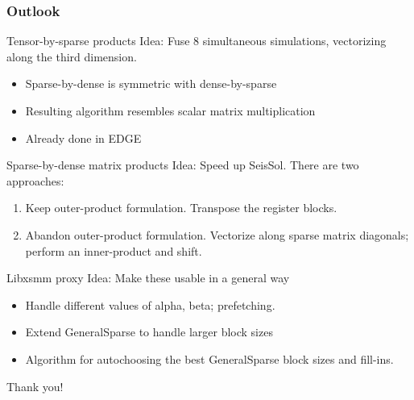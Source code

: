 \documentclass[9pt]{beamer}
\begin{document}
\begin{frame}[fragile]
  \frametitle{Outlook}

  \begin{block}{Tensor-by-sparse products}
  Idea: Fuse 8 simultaneous simulations, vectorizing along the third dimension.
    \begin{itemize}
    \item Sparse-by-dense is symmetric with dense-by-sparse
    \item Resulting algorithm resembles scalar matrix multiplication
    \item Already done in EDGE
    \end{itemize}
  \end{block}

  \begin{block}{Sparse-by-dense matrix products}
  Idea: Speed up SeisSol. There are two approaches:
    \begin{enumerate}
    \item Keep outer-product formulation. Transpose the register blocks.
    \item Abandon outer-product formulation. Vectorize along sparse matrix diagonals; perform an inner-product and shift.
    \end{enumerate}
  \end{block}

  \begin{block}{Libxsmm proxy}
  Idea: Make these usable in a general way
    \begin{itemize}
    \item Handle different values of alpha, beta; prefetching. 
    \item Extend GeneralSparse to handle larger block sizes
    \item Algorithm for autochoosing the best GeneralSparse block sizes and fill-ins.
    \end{itemize}
  \end{block}

\end{frame}




\begin{frame}[plain,c]
\begin{center}
    \huge Thank you!
\end{center}
\end{frame}
\end{document}
